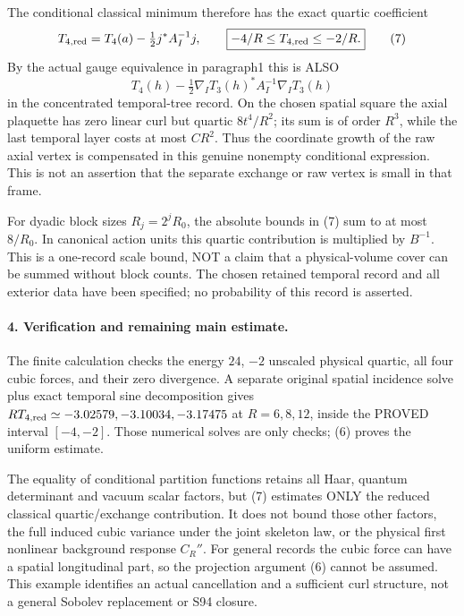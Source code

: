 \documentclass[11pt]{article}
\begin{document}
The conditional classical minimum therefore has the exact quartic
coefficient
\[
 T_{4,\rm red}=T_4(a)-\tfrac12j^*A_I^{-1}j,
 \qquad \boxed{-4/R\le T_{4,\rm red}\le-2/R.}                 \tag{7}
\]
By the actual gauge equivalence in paragraph1 this is ALSO
\[
 T_4(h)-\tfrac12\nabla_I T_3(h)^*A_I^{-1}\nabla_I T_3(h)         \tag{8}
\]
in the concentrated temporal-tree record. On the chosen spatial square the axial plaquette has zero linear curl
but quartic $8t^4/R^2$; its sum is of order $R^3$, while the last
temporal layer costs at most $CR^2$. Thus the coordinate growth
of the raw axial vertex is compensated in this genuine nonempty
conditional expression. This is not an assertion that the separate
exchange or raw vertex is small in that frame.

For dyadic block sizes $R_j=2^jR_0$, the absolute bounds in (7) sum to
at most $8/R_0$. In canonical action units this quartic contribution
is multiplied by $B^{-1}$. This is a one-record scale bound, NOT a
claim that a physical-volume cover can be summed without block counts.
The chosen retained temporal record and all exterior data have been
specified; no probability of this record is asserted.

\paragraph{4. Verification and remaining main estimate.}
The finite calculation checks the energy $24$, $-2$ unscaled physical quartic,
all four cubic forces, and their zero divergence. A separate original
spatial incidence solve plus exact temporal sine decomposition gives
$R T_{4,\rm red}\simeq-3.02579,-3.10034,-3.17475$ at $R=6,8,12$,
inside the PROVED interval $[-4,-2]$. Those numerical solves are only
checks; (6) proves the uniform estimate.

The equality of conditional partition functions retains all Haar,
quantum determinant and vacuum scalar factors, but (7) estimates ONLY
the reduced classical quartic/exchange contribution. It does not bound
those other factors, the full induced cubic variance under the joint
skeleton law, or the physical first nonlinear background response
$C_R''$. For general records the cubic force can have a spatial
longitudinal part, so the projection argument (6) cannot be assumed.
This example identifies an actual cancellation and a sufficient curl
structure, not a general Sobolev replacement or S94 closure.
\end{document}
